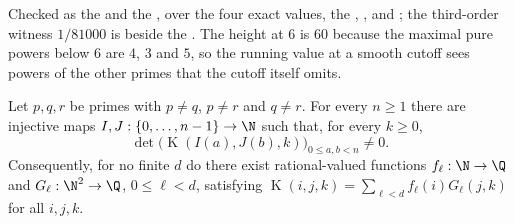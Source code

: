 \documentclass[11pt]{article}
\newcommand{\Kernel}{\operatorname{K}}
\begin{document}
\noindent Checked as the
 and the
, over the four exact values, the
,
,
 and
;
the third-order witness $1/81000$ is
beside the
.  The height at $6$ is $60$ because the maximal pure powers below $6$ are
$4$, $3$ and $5$, so the running value at a smooth cutoff sees powers of the
other primes that the cutoff itself omits.

\begin{theorem}\label{long269:res:infinite-rank}
\label{long269:res:lead-infinite-rank}
Let $p,q,r$ be primes with $p\ne q$, $p\ne r$ and $q\ne r$.  For every
$n\ge1$ there are injective maps $I,J:\{0,\ldots,n-1\}\to\N$ such that, for
every $k\ge0$,
\[
 \det\bigl(\Kernel(I(a),J(b),k)\bigr)_{0\le a,b<n}\ne0 .
\]
Consequently, for no finite $d$ do there exist rational-valued functions
$f_\ell:\N\to\Q$ and $G_\ell:\N^{2}\to\Q$, $0\le\ell<d$, satisfying
$\Kernel(i,j,k)=\sum_{\ell<d}f_\ell(i)G_\ell(j,k)$ for all $i,j,k$.
\end{theorem}
\end{document}

